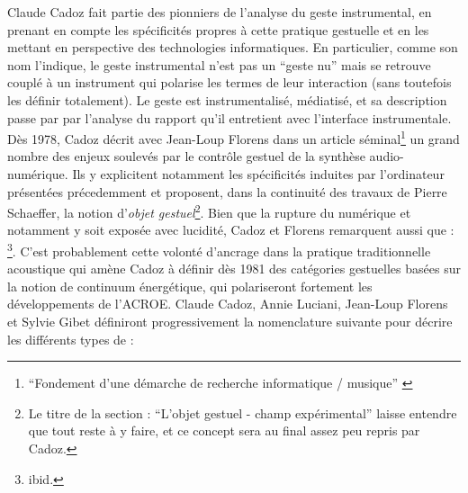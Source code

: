 \noindent Claude Cadoz fait partie des pionniers de l'analyse du geste instrumental, en prenant en compte les spécificités propres à cette pratique gestuelle et en les mettant en perspective des technologies informatiques. En particulier, comme son nom l'indique, le geste instrumental n'est pas un ``geste nu'' mais se retrouve couplé à un instrument qui polarise les termes de leur interaction (sans toutefois les définir totalement). Le geste est instrumentalisé, médiatisé, et sa description passe par par l'analyse du rapport qu'il entretient avec l'interface instrumentale.\\
\indent Dès 1978, Cadoz décrit avec Jean-Loup Florens dans un article séminal\footnote{``Fondement d’une démarche de recherche informatique / musique'' \cite{cadoz_fondement_1978}} un grand nombre des  enjeux soulevés par le contrôle gestuel de la synthèse audio-numérique. Ils y explicitent notamment les spécificités induites par l'ordinateur présentées précedemment et proposent, dans la continuité des travaux de Pierre Schaeffer, la notion d'\textit{objet gestuel}\footnote{Le titre de la section : ``L'objet gestuel - champ expérimental'' laisse entendre que tout reste à y faire, et ce concept sera au final assez peu repris par Cadoz.}. Bien que la rupture du numérique et notamment  y soit exposée avec lucidité, Cadoz et Florens remarquent aussi que : \footnote{ibid.}. C'est probablement cette volonté d'ancrage dans la pratique traditionnelle acoustique qui amène Cadoz à définir dès 1981 \cite{cadoz_synthese_1981} des catégories gestuelles basées sur la notion de continuum énergétique, qui polariseront fortement les développements de l'\gls{ACROE}. Claude Cadoz, Annie Luciani, Jean-Loup Florens et Sylvie Gibet définiront progressivement la nomenclature suivante pour décrire les différents types de  :
\vspace{-1em}
